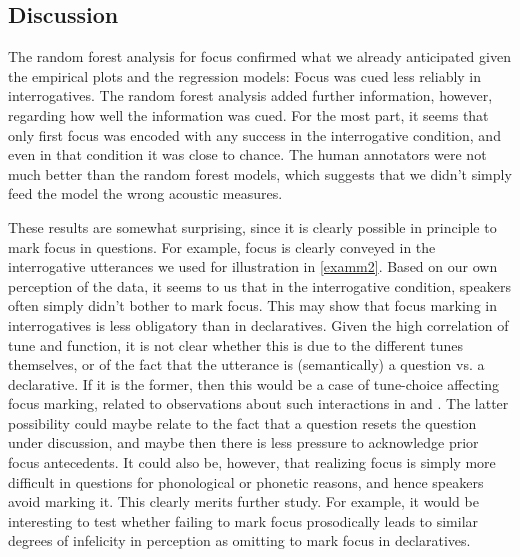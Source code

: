 \documentclass[preprint,review,12pt,authoryear,times]{elsarticle}
\begin{document}
\subsection{Discussion}
\label{twoprom}

The random forest analysis for focus confirmed what we already anticipated given the empirical plots and the regression models: Focus was cued less reliably in interrogatives. The random forest analysis added further information, however, regarding how well the information was cued. For the most part, it seems that only first focus was encoded with any success in the interrogative condition, and even in that condition it was close to chance. The human annotators were not much better than the random forest models, which suggests that we didn't simply feed the model the wrong acoustic measures. 

These results are somewhat surprising, since it is clearly possible in principle to mark focus in questions. For example, focus is clearly conveyed in the interrogative utterances we used for illustration in \ref{examm2}. Based on our own perception of the data, it seems to us that in the interrogative condition, speakers often simply didn't bother to mark focus. This may show that focus marking in interrogatives is less obligatory than in declaratives. Given the high correlation of tune and function, it is not clear whether this is due to the different tunes themselves, or of the fact that the utterance is (semantically) a question vs. a declarative. If it is the former, then this would be a case of tune-choice affecting focus marking, related to observations about such interactions in  \citet{goodhueetal16} and \citet{schlo18}. The latter possibility could maybe relate to the fact that a question resets the question under discussion, and maybe then there is less pressure to acknowledge prior focus antecedents. It could also be, however, that realizing focus is simply more difficult in questions for phonological or phonetic reasons, and hence speakers avoid marking it. This clearly merits further study. For example, it would be interesting to test whether failing to mark focus prosodically leads to similar degrees of infelicity in perception as omitting to mark focus in declaratives. 
\end{document}
